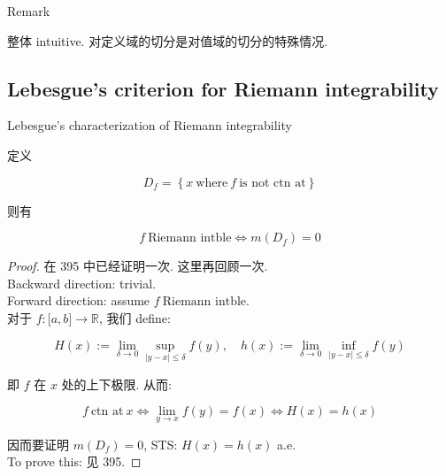 \documentclass{qlnotes-export}
\begin{document}
\begin{qlremark}{Remark}

整体 intuitive. 对定义域的切分是对值域的切分的特殊情况.

\end{qlremark}

\subsection{Lebesgue's criterion for Riemann integrability}\label{lebesgues-criterion-for-riemann-integrability}

\begin{theorem}{Lebesgue's characterization of Riemann integrability}\label{thm-05-integration-of-real-and-complex-functions-lebesgue-s-characterization-of-riemann-integrability}

定义

\[D_{f} = \left\{ {x\ \text{where}\ f\ \text{is not ctn at}} \right\}\]

则有

\[f\ \text{Riemann intble}\Leftrightarrow m(D_{f}) = 0\]

\end{theorem}

\begin{proof}

在 395 中已经证明一次. 这里再回顾一次.\\
Backward direction: trivial.\\
Forward direction: assume \(f\ \text{Riemann intble}\).\\
对于 \(f:\lbrack a,b\rbrack\rightarrow{\mathbb{R}}\), 我们 define:

\[H(x) := \lim\limits_{\delta\rightarrow 0}\sup\limits_{|y - x| \leq \delta}f(y),\quad h(x) := \lim\limits_{\delta\rightarrow 0}\inf\limits_{|y - x| \leq \delta}f(y)\]

即 \(f\) 在 \(x\) 处的上下极限. 从而:

\[f\ \text{ctn at}\ x\Leftrightarrow\lim\limits_{y\rightarrow x}f(y) = f(x)\Leftrightarrow H(x) = h(x)\]

因而要证明 \(m(D_{f}) = 0\), STS: \(H(x) = h(x)\) a.e.\\
To prove this: 见 395.

\end{proof}
\end{document}
